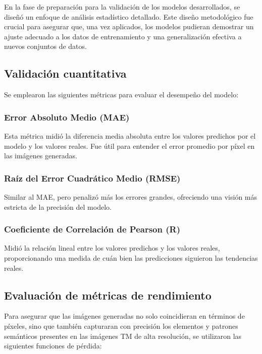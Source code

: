         En la fase de preparación para la validación de los modelos desarrollados, se diseñó un enfoque de análisis estadístico detallado. Este diseño metodológico fue crucial para asegurar que, una vez aplicados, los modelos pudieran demostrar un ajuste adecuado a los datos de entrenamiento y una generalización efectiva a nuevos conjuntos de datos.
            
        \subsection{Validación cuantitativa}
            
            Se emplearon las siguientes métricas para evaluar el desempeño del modelo:
            
            \subsubsection{Error Absoluto Medio (MAE)} 
                Esta métrica midió la diferencia media absoluta entre los valores predichos por el modelo y los valores reales. Fue útil para entender el error promedio por píxel en las imágenes generadas.
                
            \subsubsection{Raíz del Error Cuadrático Medio (RMSE)} 
                Similar al MAE, pero penalizó más los errores grandes, ofreciendo una visión más estricta de la precisión del modelo.
                
            \subsubsection{Coeficiente de Correlación de Pearson (R)} 
                Midió la relación lineal entre los valores predichos y los valores reales, proporcionando una medida de cuán bien las predicciones siguieron las tendencias reales.
            
        \subsection{Evaluación de métricas de rendimiento}
            
            Para asegurar que las imágenes generadas no solo coincidieran en términos de píxeles, sino que también capturaran con precisión los elementos y patrones semánticos presentes en las imágenes TM de alta resolución, se utilizaron las siguientes funciones de pérdida:
            
